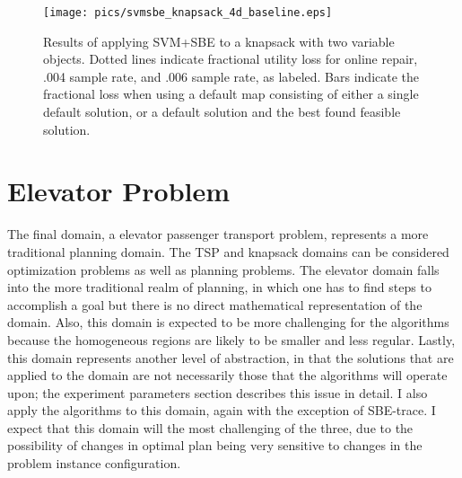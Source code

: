 \begin{figure}
\begin{center}
\texttt{[image: pics/svmsbe\_knapsack\_4d\_baseline.eps]}
\caption{Results of applying SVM+SBE to a knapsack with two variable objects.  Dotted lines indicate fractional utility loss for online repair, .004 sample rate, and .006 sample rate, as labeled.  Bars indicate the fractional loss when using a default map consisting of either a single default solution, or a default solution and the best found feasible solution.}
\label{fig:svmsbe_knapsack_4d_baseline}
\end{center}
\end{figure}









\section{Elevator Problem}

The final domain, a elevator passenger transport problem,  represents a more traditional planning domain.  The TSP and knapsack domains can be considered optimization problems as well as planning problems.  The elevator domain  falls into the more traditional realm of planning, in which one has to find steps to accomplish a goal but  there is no direct mathematical representation of the domain.  Also, this domain is expected to be more challenging for the algorithms because the homogeneous regions are likely to be smaller and less regular.  Lastly, this domain represents  another level of abstraction, in that the solutions that are applied to the domain are not necessarily those that the algorithms will operate upon; the experiment parameters section describes this issue in detail.  I also apply the algorithms to this domain, again with the exception of SBE-trace.  I expect that this domain will the most challenging of the three, due to the possibility of changes in optimal plan being very sensitive to changes in the problem instance configuration.



